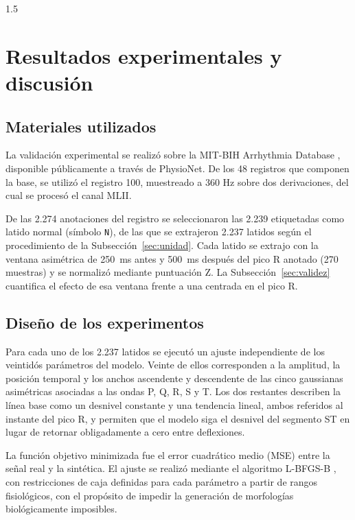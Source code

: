 \begin{spacing}{1.5}

\section{Resultados experimentales y discusión}\label {sec:results}

\subsection{Materiales utilizados}

La validación experimental se realizó sobre la MIT-BIH Arrhythmia Database \cite{moody2001impact}, disponible públicamente a través de PhysioNet. De los 48 registros que componen la base, se utilizó el registro 100, muestreado a 360 Hz sobre dos derivaciones, del cual se procesó el canal MLII.

De las 2.274 anotaciones del registro se seleccionaron las 2.239 etiquetadas como latido normal (símbolo \texttt{N}), de las que se extrajeron 2.237 latidos según el procedimiento de la Subsección~\ref{sec:unidad}. Cada latido se extrajo con la ventana asimétrica de 250~ms antes y 500~ms después del pico R anotado (270 muestras) y se normalizó mediante puntuación Z. La Subsección~\ref{sec:validez} cuantifica el efecto de esa ventana frente a una centrada en el pico R.

\subsection{Diseño de los experimentos}

Para cada uno de los 2.237 latidos se ejecutó un ajuste independiente de los veintidós parámetros del modelo. Veinte de ellos corresponden a la amplitud, la posición temporal y los anchos ascendente y descendente de las cinco gaussianas asimétricas asociadas a las ondas P, Q, R, S y T. Los dos restantes describen la línea base como un desnivel constante y una tendencia lineal, ambos referidos al instante del pico R, y permiten que el modelo siga el desnivel del segmento ST en lugar de retornar obligadamente a cero entre deflexiones.

La función objetivo minimizada fue el error cuadrático medio (MSE) entre la señal real y la sintética. El ajuste se realizó mediante el algoritmo L-BFGS-B \cite{byrd1995limited}, con restricciones de caja definidas para cada parámetro a partir de rangos fisiológicos, con el propósito de impedir la generación de morfologías biológicamente imposibles.


\end{spacing}

